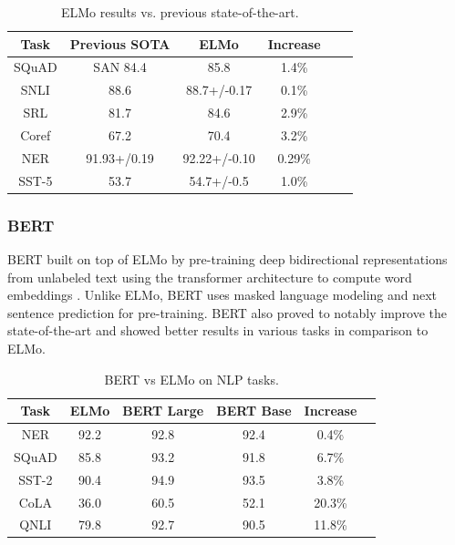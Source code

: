  \begin{table}[h!]
  \begin{center}
    \begin{tabular}{ |c|c|c|c|c|c| }
    \hline
      \textbf{Task} & \textbf{Previous SOTA} & \textbf{ELMo} & \textbf{Increase} \\ 
    \hline
      SQuAD & SAN 84.4 & 85.8 & 1.4\% \\  
      SNLI & \citep{DBLP:journals/corr/ChenZLWJ16} 88.6 & 88.7+/-0.17 & 0.1\% \\ 
      SRL & \citep{he-etal-2017-deep} 81.7 &  84.6 & 2.9\% \\ 
      Coref & \citep{DBLP:journals/corr/LeeHLZ17} 67.2 &  70.4 & 3.2\% \\
      NER & \citep{DBLP:journals/corr/PetersABP17} 91.93+/0.19 &  92.22+/-0.10 & 0.29\% \\
      SST-5 & \citep{DBLP:journals/corr/abs-1708-00107} 53.7 & 54.7+/-0.5 & 1.0\% \\
    \hline 
    \end{tabular}
    \caption{ELMo results vs. previous state-of-the-art.}
    \label{table:1}
    \citep{Peters:2018}
  \end{center}
\end{table}

\subsubsection{BERT}

BERT built on top of ELMo by pre-training deep bidirectional representations from unlabeled text using the transformer architecture to compute word embeddings \citep{DBLP:journals/corr/abs-1810-04805}. Unlike ELMo, BERT uses masked language modeling and next sentence prediction for pre-training. BERT also proved to notably improve the state-of-the-art and showed better results in various tasks in comparison to ELMo.

\begin{table}[h!]
  \begin{center}
    \begin{tabular}{ |c|c|c|c|c|c| }
    \hline
      \textbf{Task} & \textbf{ELMo} & \textbf{BERT Large} & \textbf{BERT Base} & \textbf{Increase} \\ 
    \hline
      NER & 92.2 & 92.8 & 92.4 & 0.4\% \\
      SQuAD & 85.8 & 93.2 & 91.8 & 6.7\% \\
      SST-2 & 90.4 & 94.9 & 93.5 & 3.8\% \\
      CoLA & 36.0 & 60.5 & 52.1 & 20.3\% \\
      QNLI & 79.8 & 92.7 & 90.5 & 11.8\% \\
    \hline 
    \end{tabular}
    \caption{BERT vs ELMo on NLP tasks.}
    \label{table:1}
    \citep{DBLP:journals/corr/abs-1810-04805}
  \end{center}
\end{table}

